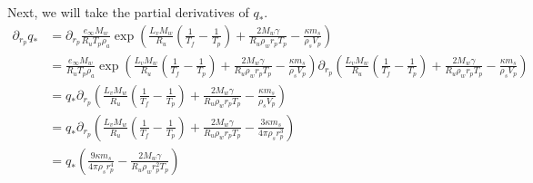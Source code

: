\documentclass{article}
\begin{document}
Next, we will take the partial derivatives of $q_{*}$.
\begin{align*}
	\partial_{r_{p}}q_{*} &= \partial_{r_{p}} \frac{e_{\infty} M_{w}}{R_{u} T_{p}\rho_{a}}
                         \exp\left(\frac{L_{v}M_{w}}{R_{u}}\left(\frac{1}{T_{f}}-\frac{1}{T_{p}}\right)
			         + \frac{2M_{w}\gamma}{R_{u}\rho_w r_{p}T_{p}}
			         - \frac{\kappa m_{s}}{\rho_{s}V_{p}}\right)\\
                      &= \frac{e_{\infty} M_{w}}{R_{u} T_{p}\rho_{a}}
		         \exp\left(\frac{L_{v}M_{w}}{R_{u}}\left(\frac{1}{T_{f}}-\frac{1}{T_{p}}\right)
			         + \frac{2M_{w}\gamma}{R_{u}\rho_w r_{p}T_{p}}
			         - \frac{\kappa m_{s}}{\rho_{s}V_{p}}\right)
			 \partial_{r_{p}}\left(\frac{L_{v}M_{w}}{R_{u}}\left(\frac{1}{T_{f}}-\frac{1}{T_{p}}\right)
			                   + \frac{2M_{w}\gamma}{R_{u}\rho_w r_{p}T_{p}}
				           - \frac{\kappa m_{s}}{\rho_{s}V_{p}}\right)\\
                      &= q_*\partial_{r_{p}}\left(\frac{L_{v}M_{w}}{R_{u}}\left(\frac{1}{T_{f}}-\frac{1}{T_{p}}\right)
		          + \frac{2M_{w}\gamma}{R_{u}\rho_w r_{p}T_{p}} - \frac{\kappa m_{s}}{\rho_{s}V_{p}}\right)\\
		      &= q_*\partial_{r_{p}}\left(\frac{L_{v}M_{w}}{R_{u}}\left(\frac{1}{T_{f}}-\frac{1}{T_{p}}\right)
			      + \frac{2M_{w}\gamma}{R_{u}\rho_{w} r_{p}T_{p}}
	  		  - \frac{3\kappa m_{s}}{4\pi\rho_{s}r_{p}^3}\right)\\
		      &= q_*\left(\frac{9\kappa m_{s}}{4\pi\rho_{s}r_{p}^4}
		       - \frac{2M_{w}\gamma}{R_{u}\rho_w r_{p}^2T_{p}}\right)\\
\end{align*}
\end{document}
